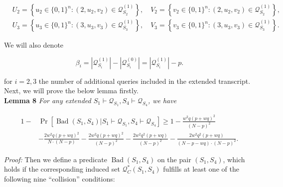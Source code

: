 $$
\begin{aligned}
&U_{2}=\left\{u_{2} \in\{0,1\}^{n}:\left(2, u_{2}, v_{2}\right) \in \mathcal{Q}_{S_{2}}^{(1)}\right\}, \quad V_{2}=\left\{v_{2} \in\{0,1\}^{n}:\left(2, u_{2}, v_{2}\right) \in \mathcal{Q}_{S_{2}}^{(1)}\right\},\\
&U_{3}=\left\{u_{3} \in\{0,1\}^{n}:\left(3, u_{3}, v_{3}\right) \in \mathcal{Q}_{S_{3}}^{(1)}\right\}, \quad V_{3}=\left\{v_{3} \in\{0,1\}^{n}:\left(3, u_{3}, v_{3}\right) \in \mathcal{Q}_{S_{3}}^{(1)}\right\}.
\end{aligned}
$$

We will also denote

$$
\beta_{i}=\left|\mathcal{Q}_{S_{i}}^{(1)}\right|-\left|\mathcal{Q}_{S_{i}}^{(0)}\right|=\left|\mathcal{Q}_{S_{i}}^{(1)}\right|-p.
$$

for $i=2, 3$ the number of additional queries included in the extended transcript.\\

Next, we will prove the below lemma firstly.\\

\noindent \textbf{Lemma 8} \emph{ For any extended $S_{1} \vdash \mathcal{Q}_{S_{1}},S_{4} \vdash \mathcal{Q}_{S_{4}}$, we have}

\begin{equation}
\begin{aligned}
1-&\operatorname{Pr}\left[\operatorname{Bad}\left(S_{1},S_{4}\right) | S_{1} \vdash \mathcal{Q}_{S_{1}},S_{4} \vdash \mathcal{Q}_{S_{4}}\right] \geq 1- \frac{w^{2} q (p+w q)^{2}}{(N-p)^{2}}\\
& -\frac{2 w^{2} q (p+w q)^{2}}{N \cdot (N-p)} - \frac{2 w^{2} q (p+w q)^{2}}{(N-p)^2} - \frac{2 w^{2} q^{2} (p+w q)}{(N-p)^2} - \frac{2 w^{2} q^{2} (p+w q)}{(N- p- wq) \cdot (N-p)^2}.
\end{aligned}
\end{equation}

\noindent \emph{Proof:} Then we define a predicate $\operatorname{Bad}\left(S_{1},S_{4}\right)$ on the pair $(S_1, S_4)$, which holds if the corresponding induced set $\mathcal{Q}_{C}^{*}\left(S_{1}, S_{4}\right)$ fulfills at least one of the following nine ``collision'' conditions:

